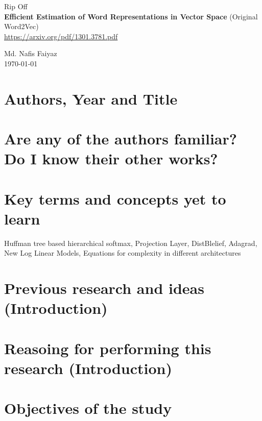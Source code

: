 \documentclass{article}
\begin{document}
\begin{titlepage}

    \begin{center}
        
        {\LARGE
            Rip Off\\
            \vspace{0.5cm}
            \textbf{Efficient Estimation of Word Representations in
            Vector Space} (Original Word2Vec)
        }\\
        \vspace{1cm}
        \url{https://arxiv.org/pdf/1301.3781.pdf}
        
        \vfill
        
        {\large Md. Nafis Faiyaz}\\
        \today
        
    \end{center}
    
\end{titlepage}

\section{Authors, Year and Title}

\section{Are any of the authors familiar? Do I know their other works?}

\section{Key terms and concepts yet to learn}
    Huffman tree based hierarchical softmax, 
    Projection Layer,
    DistBlelief,
    Adagrad,
    New Log Linear Models,
    Equations for complexity in different architectures

\section{Previous research and ideas (Introduction)}

\section{Reasoing for performing this research (Introduction)}

\section{Objectives of the study}
\end{document}
